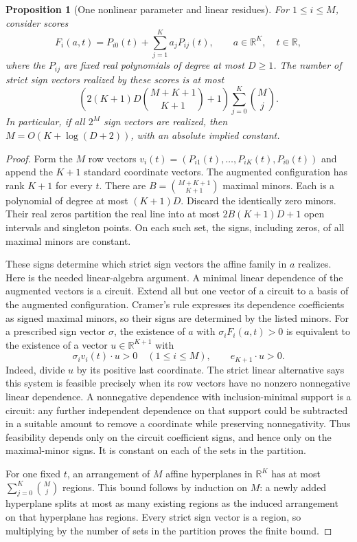 \documentclass[11pt]{article}
\newtheorem{proposition}{Proposition}
\begin{document}
\begin{proposition}[One nonlinear parameter and linear residues]
\label{prop:one-shift}
For $1\le i\le M$, consider scores
\[
 F_i(a,t)=P_{i0}(t)+\sum_{j=1}^K a_j P_{ij}(t),
 \qquad a\in\mathbb R^K,\quad t\in\mathbb R,
\]
where the $P_{ij}$ are fixed real polynomials of degree at most
$D\ge1$. The number of strict sign vectors realized by these scores
is at most
\[
 \left(2(K+1)D\binom{M+K+1}{K+1}+1\right)
 \sum_{j=0}^K\binom Mj.
\]
In particular, if all $2^M$ sign vectors are realized, then
$M=O(K+\log(D+2))$, with an absolute implied constant.
\end{proposition}
\begin{proof}
Form the $M$ row vectors
$v_i(t)=(P_{i1}(t),\ldots,P_{iK}(t),P_{i0}(t))$ and append the
$K+1$ standard coordinate vectors. The augmented configuration has
rank $K+1$ for every $t$. There are
$B=\binom{M+K+1}{K+1}$ maximal minors. Each is a polynomial of
degree at most $(K+1)D$. Discard the identically zero minors. Their
real zeros partition the real line into at most
$2B(K+1)D+1$ open intervals and singleton points. On each such set,
the signs, including zeros, of all maximal minors are constant.

These signs determine which strict sign vectors the affine family
in $a$ realizes. Here is the needed linear-algebra argument. A
minimal linear dependence of the augmented vectors is a circuit.
Extend all but one vector of a circuit to a basis of the augmented
configuration. Cramer's rule expresses its dependence coefficients
as signed maximal minors, so their signs are determined by the
listed minors. For a prescribed sign vector $\sigma$, the existence
of $a$ with $\sigma_i F_i(a,t)>0$ is equivalent to the existence of
a vector $u\in\mathbb R^{K+1}$ with
\[
 \sigma_i v_i(t)\mathbin{\cdot}u>0\quad(1\le i\le M),
 \qquad e_{K+1}\mathbin{\cdot}u>0.
\]
Indeed, divide $u$ by its positive last coordinate. The strict
linear alternative says this system is feasible precisely when its
row vectors have no nonzero nonnegative linear dependence. A
nonnegative dependence with inclusion-minimal support is a circuit:
any further independent dependence on that support could be
subtracted in a suitable amount to remove a coordinate while
preserving nonnegativity. Thus feasibility depends only on the
circuit coefficient signs, and hence only on the maximal-minor
signs. It is constant on each of the sets in the partition.

For one fixed $t$, an arrangement of $M$ affine hyperplanes in
$\mathbb R^K$ has at most $\sum_{j=0}^K\binom Mj$ regions. This
bound follows by induction on $M$: a newly added hyperplane splits
at most as many existing regions as the induced arrangement on
that hyperplane has regions. Every strict sign vector is a region,
so multiplying by the number of sets in the partition proves the
finite bound.


\end{proof}
\end{document}

